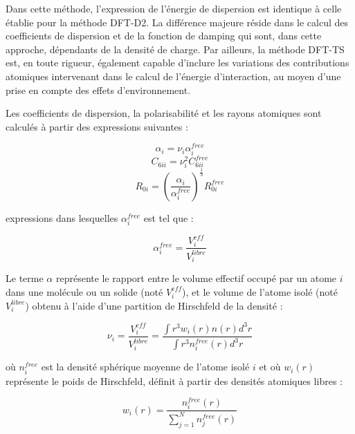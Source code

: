 {	Dans cette méthode, l’expression de l'énergie de dispersion est identique à celle établie pour la méthode DFT-D2. La différence majeure réside dans le calcul des coefficients de dispersion et de la fonction de damping qui sont, dans cette approche, dépendants de la densité de charge. Par ailleurs, la méthode DFT-TS est, en toute rigueur, également capable d'inclure les variations des contributions atomiques intervenant dans le calcul de l’énergie d’interaction, au moyen d'une prise en compte des effets d'environnement. 
	
	Les coefficients de dispersion, la polarisabilité et les rayons atomiques sont calculés à partir des expressions suivantes :
	
	
		\begin{equation} \alpha_{i} = \nu_{i} \alpha_{i}^{free} \end{equation}
		\begin{equation} C_{6ii} = \nu_{i}^{2} C_{6ii}^{free} \end{equation}
		\begin{equation} R_{0i} = \left(\frac{\alpha_{i}}{\alpha_{i}^{free}}\right)^{\frac{1}{3}} R_{0i}^{free} \end{equation}

	
	\noindent expressions dans lesquelles $\alpha_{i}^{free}$ est tel que :
	
	\begin{equation}
	\alpha_{i}^{free} = \frac{V_{i}^{eff}}{V_{i}^{libre}}
	\end{equation}
	
	Le terme $\alpha$ représente le rapport entre le volume effectif occupé par un atome $i$ dans une molécule ou un solide (noté $V_{i}^{eff}$), et le volume de l’atome isolé (noté $V_{i}^{libre}$) obtenu à l’aide d’une partition de Hirschfeld de la densité \cite{buvcko2014extending} :
	
	\begin{equation}
	\nu_{i} = \frac{V_{i}^{eff}}{V_{i}^{libre}} = \frac{\int r^{3} w_{i}(r)n(r)d^{3}r}{\int r^{3} n_{i}^{free} (r)d^{3}r}
	\end{equation}
	
	où $n_{i}^{free}$ est la densité sphérique moyenne de l’atome isolé $i$ et où $w_{i}(r)$ représente le poids de Hirschfeld, définit à partir des densités atomiques libres : 
	
	\begin{equation}
	w_{i}(r)= \frac{n_{i}^{free}(r)}{\sum_{j=1}^{N} n_{j}^{free}(r)}
	\end{equation}
	\bigskip
	
}
